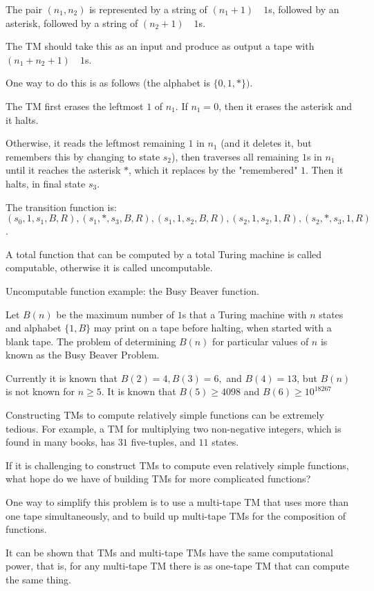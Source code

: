 \documentclass{article}
\begin{document}
The pair $(n_1, n_2)$ is represented by a string of $(n_1 + 1) \quad 1$s, followed by an asterisk, followed by a string of $(n_2 + 1) \quad 1$s. 

The TM should take this as an input and produce as output a tape with $(n_1 + n_2 + 1) \quad 1$s.

One way to do this is as follows (the alphabet is $\{0,1,*\})$.

The TM first erases the leftmost $1$ of $n_1$. If $n_1 = 0$, then it erases the asterisk and it halts.

Otherwise, it reads the leftmost remaining $1$ in $n_1$ (and it deletes it, but remembers this by changing to state $s_2$), then traverses all remaining $1$s in $n_1$ until it reaches the asterisk $*$, which it replaces by the "remembered" $1$. Then it halts, in final state $s_3$.

The transition function is: $(s_0, 1, s_1, B, R), (s_1, *, s_3, B, R), (s_1, 1, s_2, B, R), (s_2, 1, s_2, 1, R), (s_2, *, s_3, 1, R)$.

A total function that can be computed by a total Turing machine is called computable, otherwise it is called uncomputable. 

Uncomputable function example: the Busy Beaver function.

Let $B(n)$ be the maximum number of $1$s that a Turing machine with $n$ states and alphabet $\{1,B\}$ may print on a tape before halting, when started with a blank tape. The problem of determining $B(n)$ for particular values of $n$ is known as the Busy Beaver Problem.

Currently it is known that $B(2) = 4, B(3) = 6,$ and $B(4) = 13$, but $B(n)$ is not known for $n \ge 5$. It is known that $B(5) \ge 4098$ and $B(6) \ge 10^{18267}$

Constructing TMs to compute relatively simple functions can be extremely tedious. For example, a TM for multiplying two non-negative integers, which is found in many books, has $31$ five-tuples, and $11$ states.

If it is challenging to construct TMs to compute even relatively simple functions, what hope do we have of building TMs for more complicated functions?

One way to simplify this problem is to use a multi-tape TM that uses more than one tape simultaneously, and to build up multi-tape TMs for the composition of functions.

It can be shown that TMs and multi-tape TMs have the same computational power, that is, for any multi-tape TM there is as one-tape TM that can compute the same thing.
\end{document}
